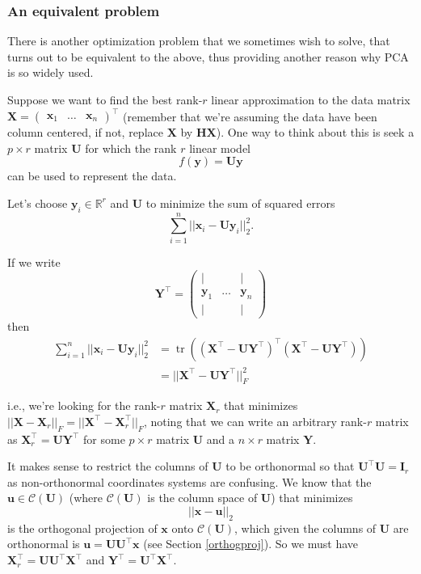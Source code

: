 \documentclass[
]{book}
\theoremstyle{definition}
\theoremstyle{definition}
\theoremstyle{definition}
\theoremstyle{definition}
\theoremstyle{remark}
\begin{document}
\subsubsection*{An equivalent problem}\label{an-equivalent-problem}

There is another optimization problem that we sometimes wish to solve, that turns out to be equivalent to the above, thus providing another reason why PCA is so widely used.

Suppose we want to find the best rank-\(r\) linear approximation to the data matrix \(\mathbf X=\begin{pmatrix}\mathbf x_1& \ldots & \mathbf x_n\end{pmatrix}^\top\) (remember that we're assuming the data have been column centered, if not, replace \(\mathbf X\) by \(\mathbf H\mathbf X\)). One way to think about this is seek a \(p\times r\) matrix \(\mathbf U\) for which the rank \(r\) linear model
\[f(\mathbf y) = \mathbf U\mathbf y\] can be used to represent the data.

Let's choose \(\mathbf y_i\in \mathbb{R}^r\) and \(\mathbf U\) to minimize the sum of squared errors
\[\sum_{i=1}^n ||\mathbf x_i - \mathbf U\mathbf y_i||^2_2.\]

If we write
\[\mathbf Y^\top = \begin{pmatrix} 
| &&|\\
\mathbf y_1& \ldots & \mathbf y_n\\
| &&|
\end{pmatrix}\]
then
\begin{align*}
\sum_{i=1}^n ||\mathbf x_i - \mathbf U\mathbf y_i||^2_2 &=\operatorname{tr}((\mathbf X^\top - \mathbf U\mathbf Y^\top)^\top (\mathbf X^\top - \mathbf U\mathbf Y^\top))\\
&=||\mathbf X^\top - \mathbf U\mathbf Y^\top||_F^2
\end{align*}

i.e., we're looking for the rank-\(r\) matrix \(\mathbf X_r\) that minimizes \(||\mathbf X- \mathbf X_r||_F=||\mathbf X^\top - \mathbf X_r^\top||_F\), noting that we can write an arbitrary rank-\(r\) matrix as \(\mathbf X_r^\top = \mathbf U\mathbf Y^\top\) for some \(p\times r\) matrix \(\mathbf U\) and a \(n \times r\) matrix \(\mathbf Y\).

It makes sense to restrict the columns of \(\mathbf U\) to be orthonormal so that \(\mathbf U^\top \mathbf U=\mathbf I_r\) as non-orthonormal coordinates systems are confusing. We know that the \(\mathbf u\in \mathcal{C}(\mathbf U)\) (where \(\mathcal{C}(\mathbf U)\) is the column space of \(\mathbf U\)) that minimizes
\[||\mathbf x-\mathbf u||_2\]
is the orthogonal projection of \(\mathbf x\) onto \(\mathcal{C}(\mathbf U)\), which given the columns of \(\mathbf U\) are orthonormal is \(\mathbf u= \mathbf U\mathbf U^\top \mathbf x\) (see Section \ref{orthogproj}). So we must have \(\mathbf X_r^\top = \mathbf U\mathbf U^\top \mathbf X^\top\) and \(\mathbf Y^\top = \mathbf U^\top \mathbf X^\top\).
\end{document}
